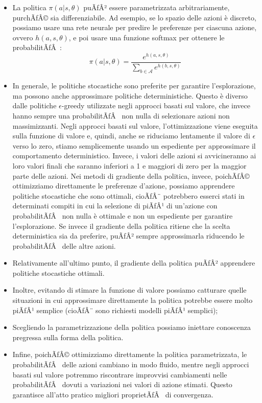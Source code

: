 ﻿\documentclass[11pt, a4paper]{report}
\begin{document}
\begin{itemize}
    \item La politica $\pi(a|s, \theta)$ puÃƒÂ² essere parametrizzata arbitrariamente, purchÃƒÂ© sia differenziabile. Ad esempio, se lo spazio delle azioni è discreto, possiamo usare una rete neurale per predire le preferenze per ciascuna azione, ovvero $h(a, s, \theta)$, e poi usare una funzione softmax per ottenere le probabilitÃƒÂ :
    \begin{equation}
    \pi(a|s, \theta) = \frac{e^{h(a, s, \theta)}}{\sum_{b \in \mathcal{A}} e^{h(b, s, \theta)}}
    \end{equation}

    \item In generale, le politiche stocastiche sono preferite per garantire l'esplorazione, ma possono anche approssimare politiche deterministiche. Questo è diverso dalle politiche $\epsilon$-greedy utilizzate negli approcci basati sul valore, che invece hanno sempre una probabilitÃƒÂ  non nulla di selezionare azioni non massimizzanti. Negli approcci basati sul valore, l'ottimizzazione viene eseguita sulla funzione di valore e, quindi, anche se riduciamo lentamente il valore di $\epsilon$ verso lo zero, stiamo semplicemente usando un espediente per approssimare il comportamento deterministico. Invece, i valori delle azioni si avvicineranno ai loro valori finali che saranno inferiori a 1 e maggiori di zero per la maggior parte delle azioni. Nei metodi di gradiente della politica, invece, poichÃƒÂ© ottimizziamo direttamente le preferenze d'azione, possiamo apprendere politiche stocastiche che sono ottimali, cioÃƒÂ¨ potrebbero esserci stati in determinati compiti in cui la selezione di piÃƒÂ¹ di un'azione con probabilitÃƒÂ  non nulla è ottimale e non un espediente per garantire l'esplorazione. Se invece il gradiente della politica ritiene che la scelta deterministica sia da preferire, puÃƒÂ² sempre approssimarla riducendo le probabilitÃƒÂ  delle altre azioni.

    \item Relativamente all'ultimo punto, il gradiente della politica puÃƒÂ² apprendere politiche stocastiche ottimali.

    \item Inoltre, evitando di stimare la funzione di valore possiamo catturare quelle situazioni in cui approssimare direttamente la politica potrebbe essere molto piÃƒÂ¹ semplice (cioÃƒÂ¨ sono richiesti modelli piÃƒÂ¹ semplici);

    \item Scegliendo la parametrizzazione della politica possiamo iniettare conoscenza pregressa sulla forma della politica.

    \item Infine, poichÃƒÂ© ottimizziamo direttamente la politica parametrizzata, le probabilitÃƒÂ  delle azioni cambiano in modo fluido, mentre negli approcci basati sul valore potremmo riscontrare improvvisi cambiamenti nelle probabilitÃƒÂ  dovuti a variazioni nei valori di azione stimati. Questo garantisce all'atto pratico migliori proprietÃƒÂ  di convergenza.
\end{itemize}
\end{document}

